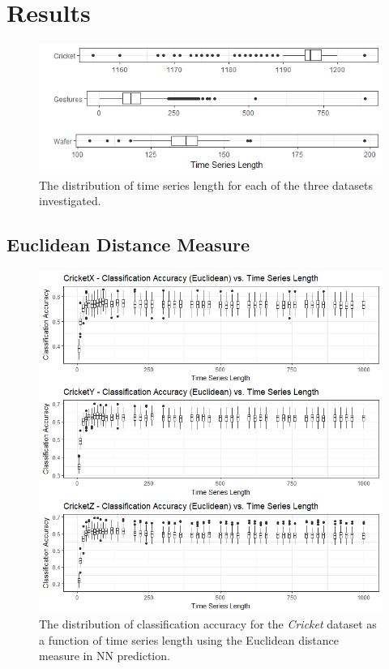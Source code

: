 \documentclass[10pt,a4paper]{article}
\begin{document}
\pagebreak
\section{Results}

\begin{figure}[H]
\begin{center}
	\includegraphics[width=1\textwidth]{Images/TimeSeriesLength_bydataset.png}
	\caption{The distribution of time series length for each of the three datasets investigated.}
\end{center}
\end{figure}

\subsection{Euclidean Distance Measure}

\begin{figure}[H]
\begin{center}
	\includegraphics[width=1\textwidth]{Images/CricketAccuracyVsLengthEUCLIDEAN_box.png}
	\caption{The distribution of classification accuracy for the \textit{Cricket} dataset as a function of time series length using the Euclidean distance measure in NN prediction.}
\end{center}
\end{figure}
\end{document}
